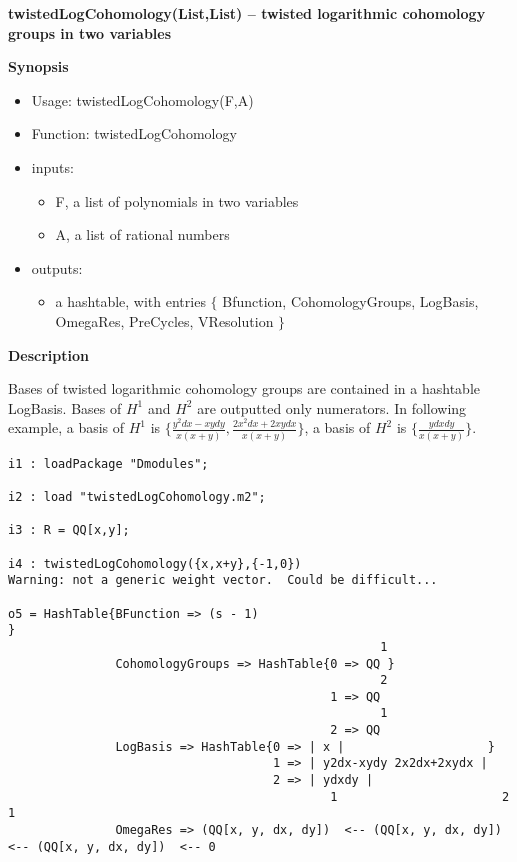 \documentclass{article}
\begin{document}
\begin{center}
{\bf twistedLogCohomology(List,List) -- twisted logarithmic cohomology groups in two variables}
\end{center}
\begin{flushleft}

{\bf Synopsis}

\begin{itemize}
\item Usage: twistedLogCohomology(F,A)
\item Function: twistedLogCohomology
\item inputs:
  \begin{itemize}
	\item F, a list of polynomials in two variables
	\item A, a list of rational numbers
  \end{itemize}
\item outputs:
  \begin{itemize}
	\item a hashtable, with entries $\{$ Bfunction, CohomologyGroups, LogBasis, OmegaRes, PreCycles, VResolution   $\}$
  \end{itemize}
\end{itemize}

{\bf Description}

Bases of twisted logarithmic cohomology groups are contained in a hashtable LogBasis. 
Bases of $H^1$ and $H^2$ are outputted only numerators. 
In following example, a basis of $H^1$ is 
$\{ \frac{y^2dx-xydy}{x(x+y)}, \frac{2x^2dx+2xydx}{x(x+y)} \}$, 
a basis of $H^2$ is $\{ \frac{ydxdy}{x(x+y)} \}$. 

{\footnotesize 
\begin{verbatim}
i1 : loadPackage "Dmodules";

i2 : load "twistedLogCohomology.m2";

i3 : R = QQ[x,y];

i4 : twistedLogCohomology({x,x+y},{-1,0})
Warning: not a generic weight vector.  Could be difficult...

o5 = HashTable{BFunction => (s - 1)                                                                    }
                                                    1
               CohomologyGroups => HashTable{0 => QQ }
                                                    2
                                             1 => QQ
                                                    1
                                             2 => QQ
               LogBasis => HashTable{0 => | x |                    }
                                     1 => | y2dx-xydy 2x2dx+2xydx |
                                     2 => | ydxdy |
                                             1                       2                       1
               OmegaRes => (QQ[x, y, dx, dy])  <-- (QQ[x, y, dx, dy])  <-- (QQ[x, y, dx, dy])  <-- 0
                                                                                                    

\end{verbatim}}
\end{flushleft}
\end{document}
